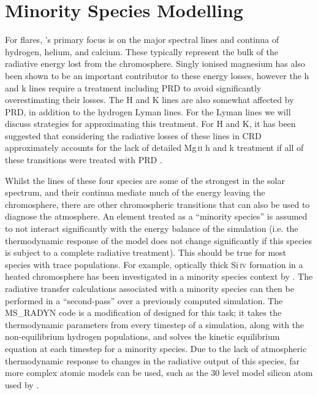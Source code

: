 \section{Minority Species Modelling}

For flares, \Radyn{}'s primary focus is on the major spectral lines and continua of hydrogen, helium, and calcium.
These typically represent the bulk of the radiative energy lost from the chromosphere.
Singly ionised magnesium has also been shown to be an important contributor to these energy losses, however the h and k lines require a treatment including PRD to avoid significantly overestimating their losses.
The \Caii{} H and K lines are also somewhat affected by PRD, in addition to the hydrogen Lyman lines.
For the Lyman lines we will discuss strategies for approximating this treatment.
For \Caii{} H and K, it has been suggested that considering the radiative losses of these lines in CRD approximately accounts for the lack of detailed Mg\,\textsc{ii} h and k treatment if all of these transitions were treated with PRD \citep{Carlsson2002, Kerr2019a}.

Whilst the lines of these four species are some of the strongest in the solar spectrum, and their continua mediate much of the energy leaving the chromosphere, there are other chromospheric transitions that can also be used to diagnose the atmosphere.
An element treated as a ``minority species'' is assumed to not interact significantly with the energy balance of the simulation (i.e. the thermodynamic response of the model does not change significantly if this species is subject to a complete radiative treatment).
This should be true for most species with trace populations.
For example, optically thick Si\,\textsc{iv} formation in a heated chromosphere has been investigated in a minority species context by \citet{Kerr2019c}.
The radiative transfer calculations associated with a minority species can then be performed in a ``second-pass'' over a previously computed \Radyn{} simulation.
The MS\_RADYN code is a modification of \Radyn{} designed for this task; it takes the thermodynamic parameters from every timestep of a \Radyn{} simulation, along with the non-equilibrium hydrogen populations, and solves the kinetic equilibrium equation at each timestep for a minority species.
Due to the lack of atmospheric thermodynamic response to changes in the radiative output of this species, far more complex atomic models can be used, such as the 30 level model silicon atom used by \citet{Kerr2019c}.


